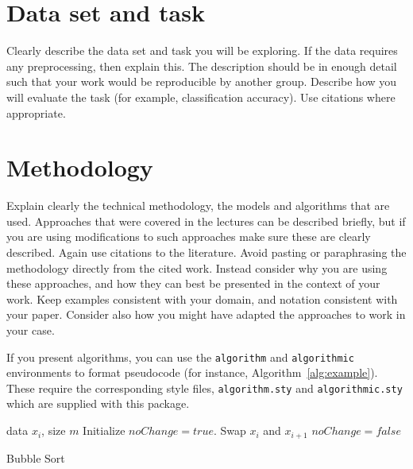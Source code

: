 \documentclass{article}
\begin{document}
\section{Data set and task} 
Clearly describe the data set and task you will be exploring.  If the data requires any preprocessing, then explain this.  The description should be in enough detail such that your work would be reproducible by another group.  Describe how you will evaluate the task (for example, classification accuracy).  Use citations where appropriate.

\section{Methodology}
Explain clearly the technical methodology, the models and algorithms that are used.  Approaches that were covered in the lectures can be described briefly, but if you are using modifications to such approaches make sure these are clearly described. Again use citations to the literature. Avoid pasting or paraphrasing the methodology directly from the cited work. Instead consider why you are using these approaches, and how they can best be presented in the context of your work. Keep examples consistent with your domain, and notation consistent with your paper. Consider also how you might have adapted the approaches to work in your case. 

If you present algorithms, you can use the \verb+algorithm+ and \verb+algorithmic+ environments to format pseudocode (for instance, Algorithm~\ref{alg:example}). These require the corresponding style files, \verb+algorithm.sty+ and \verb+algorithmic.sty+ which are supplied with this package. 

\begin{algorithm}[ht]
\begin{algorithmic}
    data $x_i$, size $m$
   \REPEAT
   \STATE Initialize $noChange = true$.
   \STATE Swap $x_i$ and $x_{i+1}$
   \STATE $noChange = false$
   \ENDIF
   \ENDFOR
\end{algorithmic}
  \caption{Bubble Sort}
  \label{alg:example}
\end{algorithm}
\end{document}
